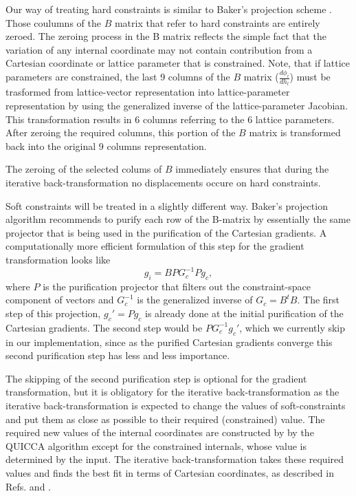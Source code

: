 \documentclass[prl,aps,preprint,superbib,12pt]{revtex4}
\begin{document}
Our way of treating hard constraints is similar to Baker's projection
scheme \cite{JBaker96}.
Those coulumns of the $B$ matrix that refer 
to hard constraints are entirely zeroed. 
The zeroing process in the B matrix reflects the simple fact 
that the variation of any internal coordinate may not contain 
contribution from a Cartesian coordinate or lattice parameter 
that is constrained.
Note, that if lattice parameters are constrained, the last 9 columns
of the $B$ matrix ($\frac{d \phi_{i}}{d h_{l}}$) must be trasformed
from lattice-vector representation into lattice-parameter 
representation by using the generalized inverse of the lattice-parameter
Jacobian. This transformation results in 6 columns referring to the 
6 lattice parameters. 
After zeroing the required columns, 
this portion of the $B$ matrix is transformed back into the original
9 columns representation.

The zeroing of the selected colums of $B$ immediately
ensures that during the iterative back-transformation 
\cite{PPulay77} no displacements occure on hard constraints.

Soft constraints will be treated in a slightly different way. 
Baker's projection algorithm recommends to purify each row
of the B-matrix by essentially the same projector that is being used
in the purification of the Cartesian gradients. 
A computationally more efficient formulation of this step for the
gradient transformation looks like
\begin{equation}
g_{i} = B P G_{c}^{-1} P g_{c} ,
\end{equation}
where $P$ is the purification projector that filters out the 
constraint-space component of vectors \cite{PPulay77} and
$G_{c}^{-1}$ is the generalized inverse of $G_{c}=B^{t}B$.
The first step of 
this projection, $g_{c}' = P g_{c}$ is already done at the initial
purification of the Cartesian gradients. The second step would be
$P G_{c}^{-1} g_{c}'$, which we currently skip in our implementation, 
since as the purified Cartesian gradients converge this second
purification step has less and less importance.

The skipping of the second purification step is optional
for the gradient transformation, but it is obligatory for the iterative
back-transformation as the iterative back-transformation is
expected to change the values of soft-constraints and
put them as close as possible to their required (constrained) value.
The required new values of the internal coordinates are constructed
by by the QUICCA algorithm except for the constrained internals,
whose value is determined by the input. The iterative 
back-transformation takes these required values and finds the best fit
in terms of Cartesian coordinates, as described in Refs. 
 and .
\end{document}
